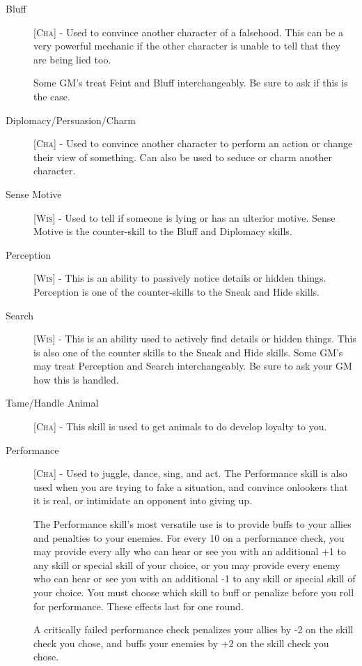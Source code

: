 \begin{description}
\item[Bluff] [\textsc{Cha}] - Used to convince another character of a falsehood. This can be a very powerful mechanic if the other character is unable to tell that they are being lied too.

Some GM’s treat Feint and Bluff interchangeably. Be sure to ask if this is the case.

\item[Diplomacy/Persuasion/Charm] [\textsc{Cha}] - Used to convince another character to perform an action or change their view of something. Can also be used to seduce or charm another character.

\item[Sense Motive] [\textsc{Wis}] - Used to tell if someone is lying or has an ulterior motive. Sense Motive is the counter-skill to the Bluff and Diplomacy skills.

\item[Perception] [\textsc{Wis}] - This is an ability to passively notice details or hidden things. Perception is one of the counter-skills to the Sneak and Hide skills.

\item[Search] [\textsc{Wis}] - This is an ability used to actively find details or hidden things. This is also one of the counter skills to the Sneak and Hide skills. Some GM’s may treat Perception and Search interchangeably. Be sure to ask your GM how this is handled.

\item[Tame/Handle Animal] [\textsc{Cha}] - This skill is used to get animals to do develop loyalty to you.

\item[Performance] [\textsc{Cha}] - Used to juggle, dance, sing, and act. The Performance skill is also used when you are trying to fake a situation, and convince onlookers that it is real, or intimidate an opponent into giving up.

The Performance skill's most versatile use is to provide buffs to your allies and penalties to your enemies. For every 10 on a performance check, you may provide every ally who can hear or see you with an additional +1 to any skill or special skill of your choice, or you may provide every enemy who can hear or see you with an additional -1 to any skill or special skill of your choice. You must choose which skill to buff or penalize before you roll for performance. These effects last for one round.

A critically failed performance check penalizes your allies by -2 on the skill check you chose, and buffs your enemies by +2 on the skill check you chose.


\end{description}
